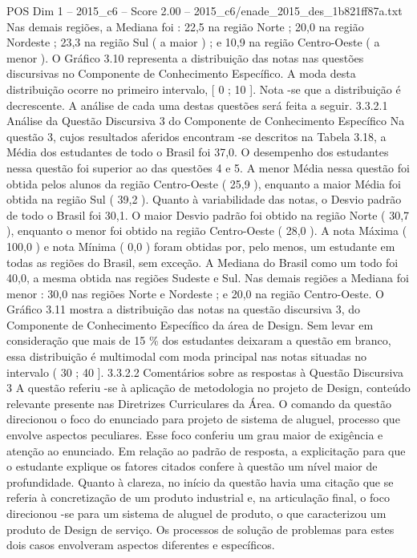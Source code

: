 \begin{textsample}{POS Dim 1 – 2015\_c6 – Score 2.00 – 2015\_c6/enade\_2015\_des\_1b821ff87a.txt}
Nas demais regiões, a Mediana foi : 22,5 na região Norte ; 20,0 na região Nordeste ; 23,3 na região Sul ( a maior ) ; e 10,9 na região Centro-Oeste ( a menor ).
O Gráfico 3.10 representa a distribuição das notas nas questões discursivas no Componente de Conhecimento Específico.
A moda desta distribuição ocorre no primeiro intervalo, [ 0 ; 10 ].
Nota -se que a distribuição é decrescente.
A análise de cada uma destas questões será feita a seguir. 3.3.2.1 Análise da Questão Discursiva 3 do Componente de Conhecimento Específico Na questão 3, cujos resultados aferidos encontram -se descritos na Tabela 3.18, a Média dos estudantes de todo o Brasil foi 37,0.
O desempenho dos estudantes nessa questão foi superior ao das questões 4 e 5.
A menor Média nessa questão foi obtida pelos alunos da região Centro-Oeste ( 25,9 ), enquanto a maior Média foi obtida na região Sul ( 39,2 ).
Quanto à variabilidade das notas, o Desvio padrão de todo o Brasil foi 30,1.
O maior Desvio padrão foi obtido na região Norte ( 30,7 ), enquanto o menor foi obtido na região Centro-Oeste ( 28,0 ).
A nota Máxima ( 100,0 ) e nota Mínima ( 0,0 ) foram obtidas por, pelo menos, um estudante em todas as regiões do Brasil, sem exceção.
A Mediana do Brasil como um todo foi 40,0, a mesma obtida nas regiões Sudeste e Sul.
Nas demais regiões a Mediana foi menor : 30,0 nas regiões Norte e Nordeste ; e 20,0 na região Centro-Oeste.
O Gráfico 3.11 mostra a distribuição das notas na questão discursiva 3, do Componente de Conhecimento Específico da área de Design.
Sem levar em consideração que mais de 15 \% dos estudantes deixaram a questão em branco, essa distribuição é multimodal com moda principal nas notas situadas no intervalo ( 30 ; 40 ]. 3.3.2.2 Comentários sobre as respostas à Questão Discursiva 3 A questão referiu -se à aplicação de metodologia no projeto de Design, conteúdo relevante presente nas Diretrizes Curriculares da Área.
O comando da questão direcionou o foco do enunciado para projeto de sistema de aluguel, processo que envolve aspectos peculiares.
Esse foco conferiu um grau maior de exigência e atenção ao enunciado.
Em relação ao padrão de resposta, a explicitação para que o estudante explique os fatores citados confere à questão um nível maior de profundidade.
Quanto à clareza, no início da questão havia uma citação que se referia à concretização de um produto industrial e, na articulação final, o foco direcionou -se para um sistema de aluguel de produto, o que caracterizou um produto de Design de serviço.
Os processos de solução de problemas para estes dois casos envolveram aspectos diferentes e específicos.

\end{textsample}
